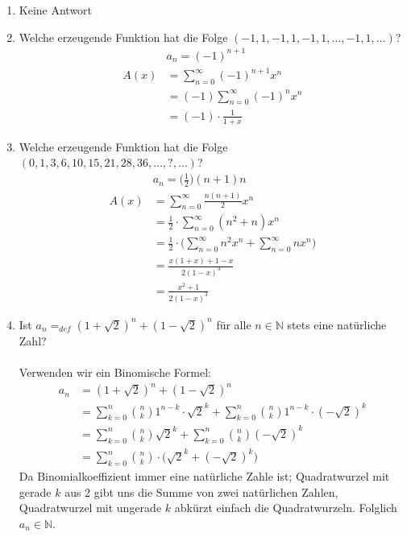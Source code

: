\begin{enumerate}[label=(\alph*)]
        \item Keine Antwort

        \item Welche erzeugende Funktion hat die Folge $(-1, 1, -1, 1, -1, 1,\ldots, -1, 1,\ldots)$?
        \begin{align*}
            &a_n = (-1)^{n+1} \\
            A(x)&=\sum_{n=0}^{\infty} (-1)^{n+1} x^n \\
            &=(-1)\sum_{n=0}^{\infty} (-1)^n x^n \\
            &=(-1)\cdot \frac{1}{1+x}
        \end{align*}

        \item Welche erzeugende Funktion hat die Folge $(0,1,3,6,10,15,21,28,36,\ldots,?,\ldots)$?
        \begin{align*}
            &a_n = \Big(\frac{1}{2}\Big)(n+1)n  \\
            A(x)&=\sum_{n=0}^{\infty} \frac{n(n+1)}{2} x^n \\
            &=\frac{1}{2}\cdot\sum_{n=0}^{\infty} (n^2+n) x^n \\
            &=\frac{1}{2}\cdot\Big(\sum_{n=0}^{\infty} n^2 x^n  + \sum_{n=0}^{\infty} n x^n\Big)\\
            &=\frac{x(1+x) + 1 -x }{2(1-x)^3} \\
            &=\frac{x^2 + 1}{2(1-x)^3}
        \end{align*}

        \item Ist $a_n =_{def} (1+\sqrt 2)^n+(1-\sqrt 2)^n$ für alle $n\in \mathbb{N}$ stets eine natürliche Zahl?\\\\
        Verwenden wir ein Binomische Formel:
        \begin{align*}
            a_n &= (1+\sqrt 2)^n+(1-\sqrt 2)^n \\
            &=\sum_{k=0}^{n} \binom{n}{k} 1^{n-k}\cdot\sqrt{2}^k +
            \sum_{k=0}^{n} \binom{n}{k} 1^{n-k}\cdot(-\sqrt{2})^k \\
            &= \sum_{k=0}^{n} \binom{n}{k}\sqrt{2}^k +
            \sum_{k=0}^{n} \binom{n}{k}(-\sqrt{2})^k \\
            &= \sum_{k=0}^{n} \binom{n}{k}\cdot\big(\sqrt{2}^k + (-\sqrt{2})^k\big)
        \end{align*}
        Da Binomialkoeffizient immer eine natürliche Zahle ist; Quadratwurzel mit gerade $k$ aus 2 
        gibt uns die Summe von zwei natürlichen Zahlen, Quadratwurzel mit ungerade $k$ abkürzt einfach
        die Quadratwurzeln. Folglich $a_n \in \mathbb{N}$.


\end{enumerate}
